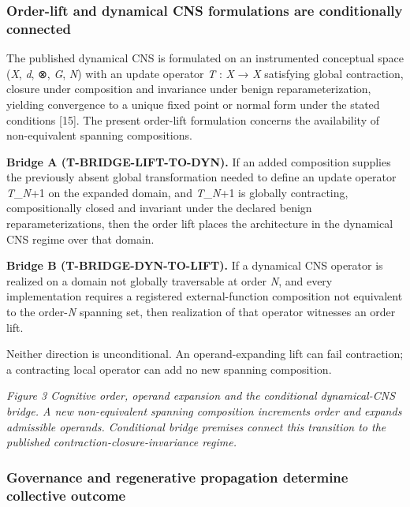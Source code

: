 \hypertarget{order-lift-and-dynamical-cns-formulations-are-conditionally-connected}{%
\subsubsection{Order-lift and dynamical CNS formulations are
conditionally
connected}\label{order-lift-and-dynamical-cns-formulations-are-conditionally-connected}}

The published dynamical CNS is formulated on an instrumented conceptual
space (\emph{X}, \emph{d}, ⊗, \emph{G}, \emph{N}) with an update
operator \emph{T} : \emph{X} → \emph{X} satisfying global contraction,
closure under composition and invariance under benign
reparameterization, yielding convergence to a unique fixed point or
normal form under the stated conditions {[}15{]}. The present order-lift
formulation concerns the availability of non-equivalent spanning
compositions.

\textbf{Bridge A (T-BRIDGE-LIFT-TO-DYN).} If an added composition
supplies the previously absent global transformation needed to define an
update operator \emph{T}\_\emph{N}+1 on the expanded domain, and
\emph{T}\_\emph{N}+1 is globally contracting, compositionally closed and
invariant under the declared benign reparameterizations, then the order
lift places the architecture in the dynamical CNS regime over that
domain.

\textbf{Bridge B (T-BRIDGE-DYN-TO-LIFT).} If a dynamical CNS operator is
realized on a domain not globally traversable at order \emph{N}, and
every implementation requires a registered external-function composition
not equivalent to the order-\emph{N} spanning set, then realization of
that operator witnesses an order lift.

Neither direction is unconditional. An operand-expanding lift can fail
contraction; a contracting local operator can add no new spanning
composition.

\emph{Figure 3 \textbar{} Cognitive order, operand expansion and the
conditional dynamical-CNS bridge. A new non-equivalent spanning
composition increments order and expands admissible operands.
Conditional bridge premises connect this transition to the published
contraction-closure-invariance regime.}

\hypertarget{governance-and-regenerative-propagation-determine-collective-outcome}{%
\subsubsection{Governance and regenerative propagation determine
collective
outcome}\label{governance-and-regenerative-propagation-determine-collective-outcome}}

